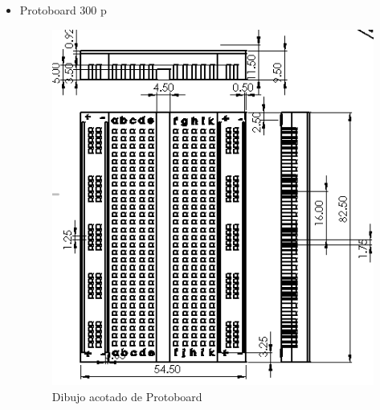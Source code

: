 \begin{itemize}
\begin{itemize}
    \item Protoboard 300 p
    \begin{figure}[H]
        \centering
        \includegraphics[scale=0.7]{32/img/protoboardCotas.PNG}
        \caption{Dibujo acotado de Protoboard}
        \label{fig:enter-label}
    \end{figure}
    

\end{itemize}
\end{itemize}

